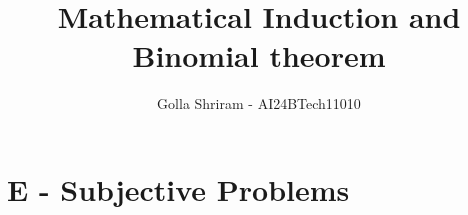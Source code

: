 \documentclass[journal,12pt,twocolumn]{IEEEtran}
\theoremstyle{remark}
\begin{document}

\onecolumn
\vspace{3cm}
\title{Mathematical Induction and Binomial theorem}
\author{Golla Shriram - AI24BTech11010}

\maketitle


\renewcommand{\thefigure}{\theenumi}
\renewcommand{\thetable}{\theenumi}


\section*{\textbf{E - Subjective Problems}}
                                                                           
\end{document}

